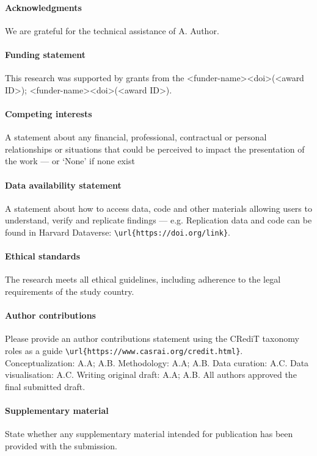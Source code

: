 \documentclass{CUP-JNL-DCE}
\begin{document}
\begin{Backmatter}

\paragraph{Acknowledgments}
We are grateful for the technical assistance of A. Author.


\paragraph{Funding statement}
This research was supported by grants from the <funder-name><doi>(<award ID>); <funder-name><doi>(<award ID>).

\paragraph{Competing interests}
A statement about any financial, professional, contractual or personal relationships or situations that could be perceived to impact the presentation of the work --- or `None' if none exist

\paragraph{Data availability statement}
A statement about how to access data, code and other materials allowing users to understand, verify and replicate findings --- e.g. Replication data and code can be found in Harvard Dataverse: \verb+\url{https://doi.org/link}+.

\paragraph{Ethical standards}
The research meets all ethical guidelines, including adherence to the legal requirements of the study country.

\paragraph{Author contributions}
Please provide an author contributions statement using the CRediT taxonomy roles as a guide {\verb+\url{https://www.casrai.org/credit.html}+}. Conceptualization: A.A; A.B. Methodology: A.A; A.B. Data curation: A.C. Data visualisation: A.C. Writing original draft: A.A; A.B. All authors approved the final submitted draft.

\paragraph{Supplementary material}
State whether any supplementary material intended for publication has been provided with the submission.


\end{Backmatter}
\end{document}
